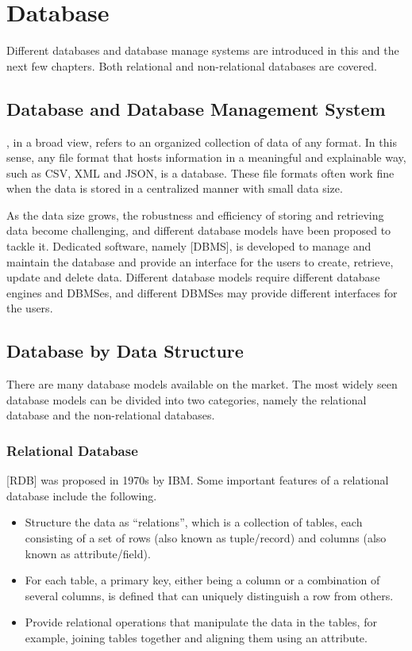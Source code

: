 \chapter{Database}

Different databases and database manage systems are introduced in this and the next few chapters. Both relational and non-relational databases are covered.

\section{Database and Database Management System}

, in a broad view, refers to an organized collection of data of any format. In this sense, any file format that hosts information in a meaningful and explainable way, such as CSV, XML and JSON, is a database. These file formats often work fine when the data is stored in a centralized manner with small data size.

As the data size grows, the robustness and efficiency of storing and retrieving data become challenging, and different database models have been proposed to tackle it. Dedicated software, namely [DBMS], is developed to manage and maintain the database and provide an interface for the users to create, retrieve, update and delete data. Different database models require different database engines and DBMSes, and different DBMSes may provide different interfaces for the users.

\section{Database by Data Structure}

There are many database models available on the market. The most widely seen database models can be divided into two categories, namely the relational database and the non-relational databases.

\subsection{Relational Database}

[RDB] was proposed in 1970s by IBM. Some important features of a relational database include the following.
\begin{itemize}
	\item Structure the data as ``relations'', which is a collection of tables, each consisting of a set of rows (also known as tuple/record) and columns (also known as attribute/field).
	\item For each table, a primary key, either being a column or a combination of several columns, is defined that can uniquely distinguish a row from others.
	\item Provide relational operations that manipulate the data in the tables, for example, joining tables together and aligning them using an attribute.
\end{itemize}

